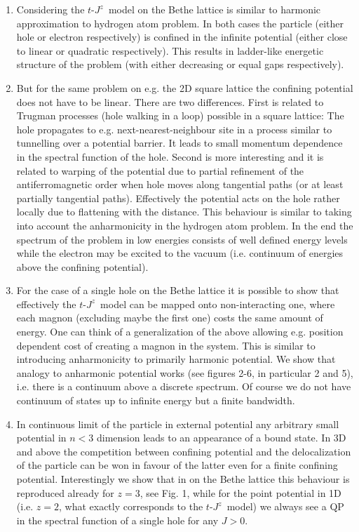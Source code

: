\documentclass[%
 reprint,
 amsmath,amssymb,
 aps,
prb,
floatfix,
]{revtex4-1}
\begin{document}
\begin{enumerate}[1.]
\item Considering the $t$-$J^z$~model on the Bethe lattice is similar to harmonic approximation to hydrogen atom problem. In both cases the particle (either hole or electron respectively) is confined in the infinite potential (either close to linear or quadratic respectively). This results in ladder-like energetic structure of the problem (with either decreasing or equal gaps respectively).

\item But for the same problem on e.g. the 2D square lattice the confining potential does not have to be linear. There are two differences. First is related to Trugman processes (hole walking in a loop) possible in a square lattice: The hole propagates to e.g. next-nearest-neighbour site in a process similar to tunnelling over a potential barrier. It leads to small momentum dependence in the spectral function of the hole. Second is more interesting and it is related to warping of the potential due to partial refinement of the antiferromagnetic order when hole moves along tangential paths (or at least partially tangential paths). Effectively the potential acts on the hole rather locally due to flattening with the distance. This behaviour is similar to  taking into account the anharmonicity in the hydrogen atom problem. In the end the spectrum of the problem in low energies consists of well defined energy levels while the electron may be excited to the vacuum (i.e. continuum of energies above the confining potential).

\item For the case of a single hole on the Bethe lattice it is possible to show that effectively the $t$-$J^z$~model can be mapped onto non-interacting one, where each magnon (excluding maybe the first one) costs the same amount of energy. One can think of a generalization of the above allowing e.g. position dependent cost of creating a magnon in the system. This is similar to introducing anharmonicity to primarily harmonic potential. We show that analogy to anharmonic potential works (see figures 2-6, in particular 2 and 5), i.e. there is a continuum above a discrete spectrum. Of course we do not have continuum of states up to infinite energy but a finite bandwidth.

\item In continuous limit of the particle in external potential any arbitrary small potential in $n < 3$ dimension leads to an appearance of a bound state. In 3D and above the competition between confining potential and the delocalization of the particle can be won in favour of the latter even for a finite confining potential. Interestingly we show that in on the Bethe lattice this behaviour is reproduced already for $z = 3$, see Fig. 1, while for the point potential in 1D (i.e. $z = 2$, what exactly corresponds to the $t$-$J^z$~model) we always see a QP in the spectral function of a single hole for any $J > 0$.  
\end{enumerate}
\end{document}
